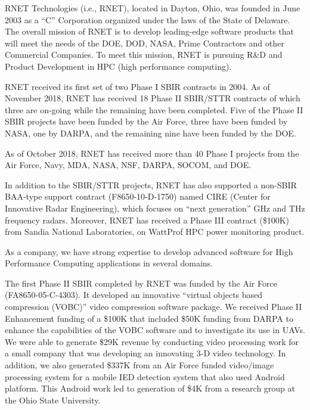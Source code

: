 
RNET Technologies (i.e., RNET), located in Dayton, Ohio, was founded
in June 2003 as a ``C'' Corporation organized under the laws of the
State of Delaware. The overall mission of RNET is to develop
leading-edge software products that will meet the needs
of the DOE, DOD, NASA, Prime Contractors and other Commercial
Companies. To meet this mission, RNET is pursuing R\&D and Product
Development in  HPC (high performance computing).

RNET received its first set of two Phase I SBIR contracts in 2004. As
of November 2018, RNET has received 18 Phase II SBIR/STTR contracts of
which three are on-going while the remaining  have been
completed. Five of the Phase II SBIR projects have been funded by the
Air Force, three have been funded by NASA, one by DARPA, and the
remaining nine have been funded by the DOE.

As of October 2018, RNET has received more than 40 Phase I projects
from the Air Force, Navy, MDA, NASA, NSF, DARPA, SOCOM, and DOE.

In addition to the SBIR/STTR projects, RNET has also supported a
non-SBIR BAA-type support contract (F8650-10-D-1750) named CIRE
(Center for Innovative Radar Engineering), which focuses on ``next
generation'' GHz and THz frequency radars. Moreover, RNET has received
a Phase III contract (\$100K) from Sandia National Laboratories, on WattProf HPC 
power monitoring product. 

As a company, we have strong expertise to develop advanced software for High 
Performance Computing applications in several domains.

The first Phase II SBIR completed by RNET was funded by the Air Force
(FA8650-05-C-4303). It developed an innovative ``virtual objects based
compression (VOBC)'' video compression software package. We received
Phase II Enhancement funding of a \$100K that included \$50K funding
from DARPA to enhance the capabilities of the VOBC software and to
investigate its use in UAVs. We were able to generate \$29K revenue by
conducting video processing work for a small company that was
developing an innovating 3-D video technology. In addition, we also
generated \$337K from an Air Force funded video/image processing system
for a mobile IED detection system that also used Android
platform. This Android work led to generation of \$4K from a research
group at the Ohio State University.

